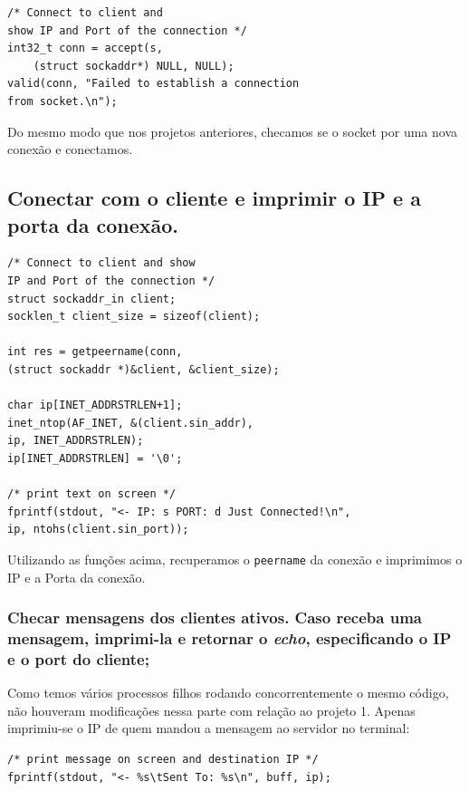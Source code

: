 \documentclass[10pt,twocolumn,letterpaper]{article}
\begin{document}
\begin{lstlisting}[caption={Estabelecimento de conexão a um novo cliente}, label=Algorithm]
/* Connect to client and 
show IP and Port of the connection */
int32_t conn = accept(s, 
    (struct sockaddr*) NULL, NULL);
valid(conn, "Failed to establish a connection 
from socket.\n");
\end{lstlisting}

    Do mesmo modo que nos projetos anteriores, checamos se o socket por uma nova conexão e conectamos.

\subsection{Conectar com o cliente e imprimir o IP e a porta da conexão.}

\begin{lstlisting}[caption={Recuperação de IP e Porta do cliente}, label=Algorithm]
/* Connect to client and show 
IP and Port of the connection */
struct sockaddr_in client;
socklen_t client_size = sizeof(client);

int res = getpeername(conn, 
(struct sockaddr *)&client, &client_size);

char ip[INET_ADDRSTRLEN+1];
inet_ntop(AF_INET, &(client.sin_addr), 
ip, INET_ADDRSTRLEN);
ip[INET_ADDRSTRLEN] = '\0';

/* print text on screen */
fprintf(stdout, "<- IP: s PORT: d Just Connected!\n", 
ip, ntohs(client.sin_port));
\end{lstlisting}

Utilizando as funções acima, recuperamos o \texttt{peername} da conexão e imprimimos o IP e a Porta da conexão.

\subsubsection{Checar mensagens dos clientes ativos. Caso receba uma mensagem, imprimi-la e retornar o \textit{echo}, especificando o IP e o port do cliente;}

    Como temos vários processos filhos rodando concorrentemente o mesmo código, não houveram modificações nessa parte com relação ao projeto 1. Apenas imprimiu-se o IP de quem mandou
    a mensagem ao servidor no terminal:

\begin{lstlisting}[caption={Impressão da porta de quem manda a mensagem}, label=Algorithm]
/* print message on screen and destination IP */
fprintf(stdout, "<- %s\tSent To: %s\n", buff, ip);
\end{lstlisting}
\end{document}
